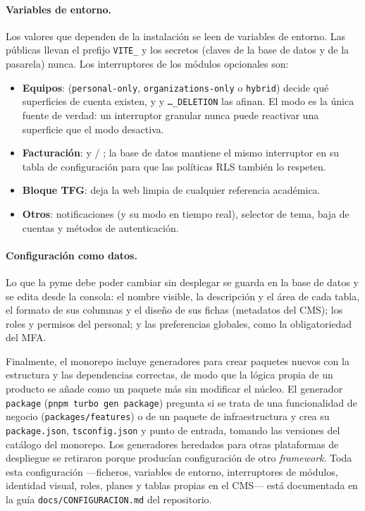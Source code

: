 \paragraph{Variables de entorno.} Los valores que dependen de la instalación
se leen de variables de entorno. Las públicas llevan el prefijo
\texttt{VITE\_} y los secretos (claves de la base de datos y de la pasarela)
nunca. Los interruptores de los módulos opcionales son:

\begin{itemize}
  \item \textbf{Equipos}: 
        (\texttt{personal-only}, \texttt{organizations-only} o
        \texttt{hybrid}) decide qué superficies de cuenta existen, y
         y
        \texttt{\ldots\_DELETION} las afinan. El modo es la única fuente de
        verdad: un interruptor granular nunca puede reactivar una superficie
        que el modo desactiva.
  \item \textbf{Facturación}:  y
         /
        ; la base de datos
        mantiene el mismo interruptor en su tabla de configuración para que
        las políticas RLS también lo respeten.
  \item \textbf{Bloque TFG}:  deja la web
        limpia de cualquier referencia académica.
  \item \textbf{Otros}: notificaciones (y su modo en tiempo real), selector
        de tema, baja de cuentas y métodos de autenticación.
\end{itemize}

\paragraph{Configuración como datos.} Lo que la pyme debe poder cambiar sin
desplegar se guarda en la base de datos y se edita desde la consola: el
nombre visible, la descripción y el área de cada tabla, el formato de sus
columnas y el diseño de sus fichas (metadatos del CMS); los roles y permisos
del personal; y las preferencias globales, como la obligatoriedad del MFA.

Finalmente, el monorepo incluye generadores para crear paquetes nuevos con la
estructura y las dependencias correctas, de modo que la lógica propia de un
producto se añade como un paquete más sin modificar el núcleo. El
generador \texttt{package} (\texttt{pnpm turbo gen package}) pregunta si se
trata de una funcionalidad de negocio (\texttt{packages/features}) o de un
paquete de infraestructura y crea su \texttt{package.json},
\texttt{tsconfig.json} y punto de entrada, tomando las versiones del catálogo
del monorepo. Los generadores heredados para otras plataformas de despliegue
se retiraron porque producían configuración de otro \textit{framework}. Toda
esta configuración ---ficheros, variables de entorno, interruptores de
módulos, identidad visual, roles, planes y tablas propias en el CMS--- está
documentada en la guía \texttt{docs/CONFIGURACION.md} del repositorio.
